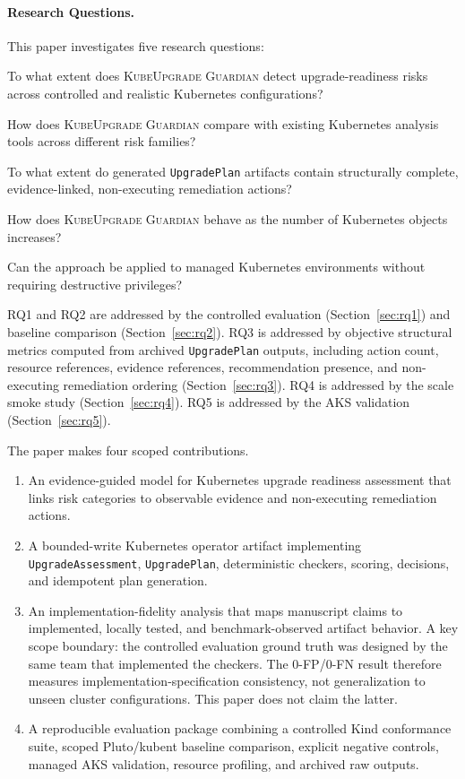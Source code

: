 \documentclass[10pt,journal]{IEEEtran}
\newcommand{\tool}{\textsc{KubeUpgrade Guardian}}
\newcommand{\crd}[1]{\texttt{#1}}
\begin{document}
\paragraph{Research Questions.}
This paper investigates five research questions:
\begin{description}[leftmargin=*,style=nextline]
  \item[RQ1 --- Detection Coverage.]\label{rq:detection} To what extent does \tool{} detect upgrade-readiness risks across controlled and realistic Kubernetes configurations?
  \item[RQ2 --- Comparative Value.]\label{rq:comparison} How does \tool{} compare with existing Kubernetes analysis tools across different risk families?
  \item[RQ3 --- Structural Plan Completeness.]\label{rq:plan-completeness} To what extent do generated \crd{UpgradePlan} artifacts contain structurally complete, evidence-linked, non-executing remediation actions?
  \item[RQ4 --- Scalability.]\label{rq:scalability} How does \tool{} behave as the number of Kubernetes objects increases?
  \item[RQ5 --- Managed Kubernetes Portability.]\label{rq:portability} Can the approach be applied to managed Kubernetes environments without requiring destructive privileges?
\end{description}
RQ1 and RQ2 are addressed by the controlled evaluation (Section~\ref{sec:rq1}) and baseline comparison (Section~\ref{sec:rq2}). RQ3 is addressed by objective structural metrics computed from archived \crd{UpgradePlan} outputs, including action count, resource references, evidence references, recommendation presence, and non-executing remediation ordering (Section~\ref{sec:rq3}). RQ4 is addressed by the scale smoke study (Section~\ref{sec:rq4}). RQ5 is addressed by the AKS validation (Section~\ref{sec:rq5}).

The paper makes four scoped contributions.
\begin{enumerate}[leftmargin=*]
  \item An evidence-guided model for Kubernetes upgrade readiness assessment that links risk categories to observable evidence and non-executing remediation actions.
  \item A bounded-write Kubernetes operator artifact implementing \crd{UpgradeAssessment}, \crd{UpgradePlan}, deterministic checkers, scoring, decisions, and idempotent plan generation.
  \item An implementation-fidelity analysis that maps manuscript claims to implemented, locally tested, and benchmark-observed artifact behavior.
  A key scope boundary: the controlled evaluation ground truth was designed by the same team that implemented the checkers. The 0-FP/0-FN result therefore measures implementation-specification consistency, not generalization to unseen cluster configurations. This paper does not claim the latter.
  \item A reproducible evaluation package combining a controlled Kind conformance suite, scoped Pluto/kubent baseline comparison, explicit negative controls, managed AKS validation, resource profiling, and archived raw outputs.
\end{enumerate}
\end{document}
